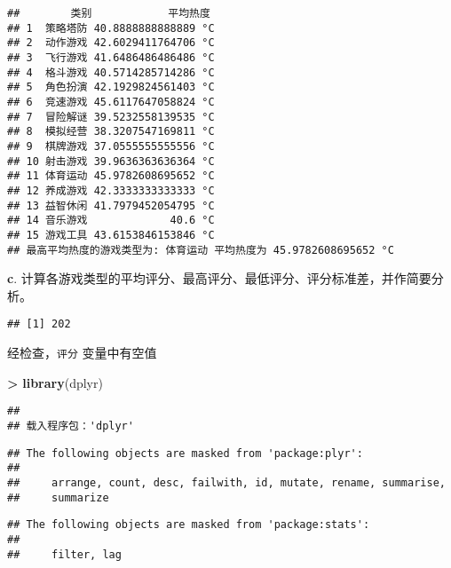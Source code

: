 \documentclass[
]{article}
\newenvironment{Shaded}{\begin{snugshade}}{\end{snugshade}}
\newcommand{\FunctionTok}[1]{\textcolor[rgb]{0.13,0.29,0.53}{\textbf{#1}}}
\newcommand{\NormalTok}[1]{#1}
\newcommand{\SpecialCharTok}[1]{\textcolor[rgb]{0.81,0.36,0.00}{\textbf{#1}}}
\begin{document}
\begin{verbatim}
##        类别            平均热度
## 1  策略塔防 40.8888888888889 °C
## 2  动作游戏 42.6029411764706 °C
## 3  飞行游戏 41.6486486486486 °C
## 4  格斗游戏 40.5714285714286 °C
## 5  角色扮演 42.1929824561403 °C
## 6  竞速游戏 45.6117647058824 °C
## 7  冒险解谜 39.5232558139535 °C
## 8  模拟经营 38.3207547169811 °C
## 9  棋牌游戏 37.0555555555556 °C
## 10 射击游戏 39.9636363636364 °C
## 11 体育运动 45.9782608695652 °C
## 12 养成游戏 42.3333333333333 °C
## 13 益智休闲 41.7979452054795 °C
## 14 音乐游戏             40.6 °C
## 15 游戏工具 43.6153846153846 °C
## 最高平均热度的游戏类型为: 体育运动 平均热度为 45.9782608695652 °C
\end{verbatim}

\textbf{c}.
计算各游戏类型的平均评分、最高评分、最低评分、评分标准差，并作简要分析。

\begin{Shaded}
\end{Shaded}

\begin{verbatim}
## [1] 202
\end{verbatim}

经检查，\texttt{评分} 变量中有空值

\begin{Shaded}
\begin{Highlighting}[]
\SpecialCharTok{\textgreater{}} \FunctionTok{library}\NormalTok{(dplyr)}
\end{Highlighting}
\end{Shaded}

\begin{verbatim}
## 
## 载入程序包：'dplyr'
\end{verbatim}

\begin{verbatim}
## The following objects are masked from 'package:plyr':
## 
##     arrange, count, desc, failwith, id, mutate, rename, summarise,
##     summarize
\end{verbatim}

\begin{verbatim}
## The following objects are masked from 'package:stats':
## 
##     filter, lag
\end{verbatim}
\end{document}
